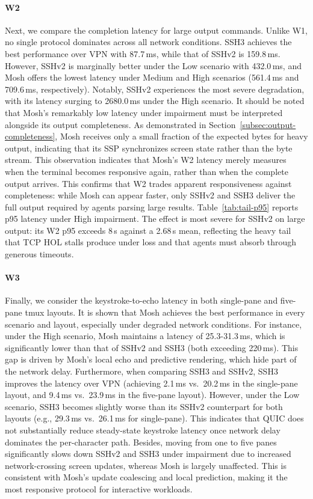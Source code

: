 \paragraph{W2}
Next, we compare the completion latency for large output commands. Unlike W1, no single protocol dominates across all network conditions. SSH3 achieves the best performance over VPN with 87.7\,ms, while that of SSHv2 is 159.8\,ms. However, SSHv2 is marginally better under the Low scenario with 432.0\,ms, and Mosh offers the lowest latency under Medium and High scenarios (561.4\,ms and 709.6\,ms, respectively). Notably, SSHv2 experiences the most severe degradation, with its latency surging to 2680.0\,ms under the High scenario. It should be noted that Mosh's remarkably low latency under impairment must be interpreted alongside its output completeness. As demonstrated in Section~\ref{subsec:output-completeness}, Mosh receives only a small fraction of the expected bytes for heavy output, indicating that its SSP synchronizes screen state rather than the byte stream. This observation indicates that Mosh's W2 latency merely measures when the terminal becomes responsive again, rather than when the complete output arrives. This confirms that W2 trades apparent responsiveness against completeness: while Mosh can appear faster, only SSHv2 and SSH3 deliver the full output required by agents parsing large results. Table~\ref{tab:tail-p95} reports p95 latency under High impairment. The effect is most severe for SSHv2 on large output: its W2 p95 exceeds 8\,s against a 2.68\,s mean, reflecting the heavy tail that TCP HOL stalls produce under loss and that agents must absorb through generous timeouts.

\paragraph{W3}
Finally, we consider the keystroke-to-echo latency in both single-pane and five-pane tmux layouts. It is shown that Mosh achieves the best performance in every scenario and layout, especially under degraded network conditions. For instance, under the High scenario, Mosh maintains a latency of 25.3-31.3\,ms, which is significantly lower than that of SSHv2 and SSH3 (both exceeding 220\,ms). This gap is driven by Mosh's local echo and predictive rendering, which hide part of the network delay. Furthermore, when comparing SSH3 and SSHv2, SSH3 improves the latency over VPN (achieving 2.1\,ms vs.\ 20.2\,ms in the single-pane layout, and 9.4\,ms vs.\ 23.9\,ms in the five-pane layout). However, under the Low scenario, SSH3 becomes slightly worse than its SSHv2 counterpart for both layouts (e.g., 29.3\,ms vs.\ 26.1\,ms for single-pane). This indicates that QUIC does not substantially reduce steady-state keystroke latency once network delay dominates the per-character path. Besides, moving from one to five panes significantly slows down SSHv2 and SSH3 under impairment due to increased network-crossing screen updates, whereas Mosh is largely unaffected. This is consistent with Mosh's update coalescing and local prediction, making it the most responsive protocol for interactive workloads.

